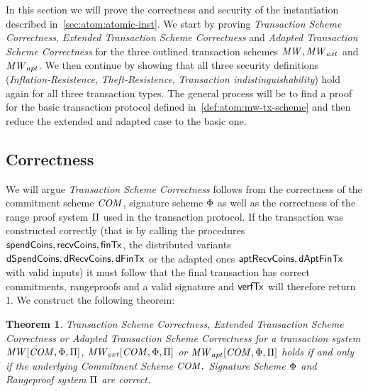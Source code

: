 In this section we will prove the correctness and security of the instantiation described in~\ref{sec:atom:atomic-inst}.
We start by proving \emph{Transaction Scheme Correctness}, \emph{Extended Transaction Scheme Correctness} and \emph{Adapted Transaction Scheme Correctness} for the three outlined transaction schemes $\mathit{MW}, \mathit{MW}_{ext}$ and $\mathit{MW}_{apt}$.
We then continue by showing that all three security definitions (\emph{Inflation-Resistence}, \emph{Theft-Resistence}, \emph{Transaction indistinguishability}) hold again for all three transaction types.
The general process will be to find a proof for the basic transaction protocol defined in~\ref{def:atom:mw-tx-scheme} and then reduce the extended and adapted case to the basic one.

\subsection{Correctness} \label{subsec:atom:correctness}

We will argue \emph{Transaction Scheme Correctness} follows from the correctness of the commitment scheme $\mathit{COM}$, signature scheme $\Phi$ as well as the correctness of the range proof system $\Pi$ used in the transaction protocol.
If the transaction was constructed correctly (that is by calling the procedures $\mathsf{spendCoins}, \mathsf{recvCoins}, \mathsf{finTx}$, the distributed variants $\mathsf{dSpendCoins}, \mathsf{dRecvCoins}, \mathsf{dFinTx}$ or the adapted ones $\mathsf{aptRecvCoins}, \mathsf{dAptFinTx}$ with valid inputs) it must follow that the final transaction has correct commitments, rangeproofs and a valid signature and $\mathsf{verfTx}$ will therefore return 1.
We construct the following theorem:

\newtheorem{theorem}{Theorem}

\begin{theorem}\label{lem:atom:correctness}
    \emph{Transaction Scheme Correctness}, \emph{Extended Transaction Scheme Correctness} or \emph{Adapted Transaction Scheme Correctness} for a transaction system $\mathit{MW}[\mathit{COM},\Phi,\Pi]$, $\mathit{MW}_{ext}[\mathit{COM},\Phi,\Pi]$ or $\mathit{MW}_{apt}[\mathit{COM},\Phi,\Pi]$ holds if and only if the underlying Commitment Scheme $\mathit{COM},$ Signature Scheme $\Phi$ and Rangeproof system $\Pi$ are correct.
\end{theorem}

